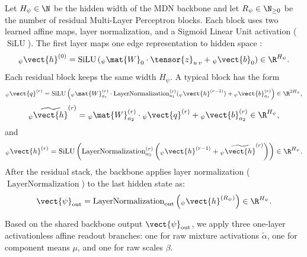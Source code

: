 Let $H_{\psi}\in\N$ be the hidden width of the MDN backbone and let
$R_{\psi}\in\N_{\ge 0}$ be the number of residual Multi-Layer Perceptron blocks.
Each block uses two learned affine maps, layer normalization, and a Sigmoid
Linear Unit activation ($\operatorname{SiLU}$).
The first layer maps one edge representation to hidden space%
:
\[
  {}_{\psi}\vect{h}^{(0)}
  =
  \operatorname{SiLU}
  \left(
    {}_{\psi}\mat{W}_{0}\cdot\tensor{z}_{u\,v}
    +
    {}_{\psi}\vect{b}_{0}
  \right)
  \in \R^{H_{\psi}}.
\]
Each residual block keeps the same width $H_{\psi}$.
A typical block has the form
\[
  {}_{\psi}\vect{q}^{(r)}
  =
  \operatorname{SiLU}
  \left(
    {}_{\psi}\mat{W}^{(r)}_{a_1}\cdot
    \operatorname{LayerNormalization}^{(r)}_{a_1}({}_{\psi}\vect{h}^{(r-1)})
    +
    {}_{\psi}\vect{b}^{(r)}_{a_1}
  \right)
  \in \R^{2H_{\psi}},
\]
\[
  {}_{\psi}\widetilde{\vect{h}}^{(r)}
  =
  {}_{\psi}\mat{W}^{(r)}_{a_2}\cdot{}_{\psi}\vect{q}^{(r)}
  +
  {}_{\psi}\vect{b}^{(r)}_{a_2}
  \in \R^{H_{\psi}},
\]
and
\[
  {}_{\psi}\vect{h}^{(r)}
  =
  \operatorname{SiLU}
  \left(
    \operatorname{LayerNormalization}^{(r)}_{a_2}
    \left(
      {}_{\psi}\vect{h}^{(r-1)}
      +
      {}_{\psi}\widetilde{\vect{h}}^{(r)}
    \right)
  \right)
  \in \R^{H_{\psi}}.
\]
After the residual stack, the backbone applies layer normalization ($\operatorname{LayerNormalization}$)%
 to the last hidden state as:
\[
  \vect{\psi}_{\mathrm{out}}
  =
  \operatorname{LayerNormalization}_{\mathrm{out}}
  \left(
    {}_{\psi}\vect{h}^{(R_{\psi})}
  \right)
  \in \R^{H_{\psi}}.
\]

Based on the shared backbone output $\vect{\psi}_{\mathrm{out}}$, we apply three
one-layer activationless affine readout branches: one for raw
mixture activations $\tilde{\alpha}$, one for component means $\mu$, and one
for raw scales $\beta$.%

